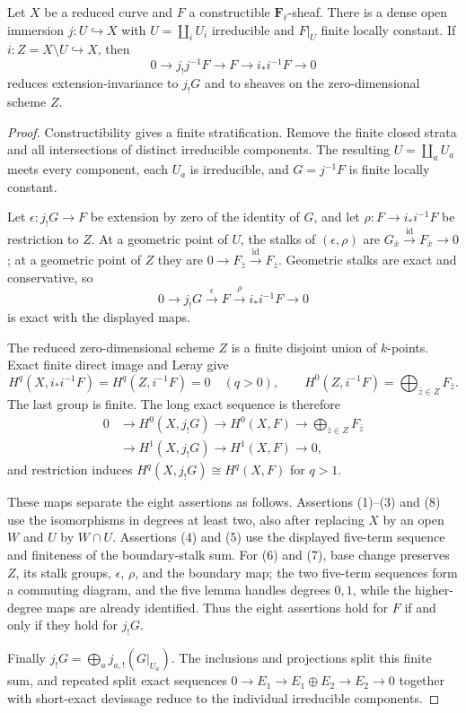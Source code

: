 \begin{lemma}
\label{lemma:weil-pbc-curve-dense-open-reduction}
\uses{}

Let $X$ be a reduced curve and $F$ a constructible $\mathbf F_\ell$-sheaf.
There is a dense open immersion $j:U\hookrightarrow X$ with
$U=\coprod_iU_i$ irreducible and $F|_U$ finite locally constant.  If
$i:Z=X\setminus U\hookrightarrow X$, then
\[
 0\longrightarrow j_!j^{-1}F\longrightarrow F
 \longrightarrow i_*i^{-1}F\longrightarrow0
\]
reduces extension-invariance to $j_!G$ and to sheaves on the zero-dimensional
scheme $Z$.
\end{lemma}
\begin{proof}

Constructibility gives a finite stratification.  Remove the finite closed
strata and all intersections of distinct irreducible components.  The
resulting $U=\coprod_aU_a$ meets every component, each $U_a$ is irreducible,
and $G=j^{-1}F$ is finite locally constant.

Let $\epsilon:j_!G\to F$ be extension by zero of the identity of $G$, and
let $\rho:F\to i_*i^{-1}F$ be restriction to $Z$.  At a geometric point of
$U$, the stalks of $(\epsilon,\rho)$ are
$G_{\bar x}\xrightarrow{\mathrm{id}}F_{\bar x}\to0$; at a geometric point
of $Z$ they are $0\to F_{\bar z}\xrightarrow{\mathrm{id}}F_{\bar z}$.
Geometric stalks are exact and conservative, so
\[
 0\longrightarrow j_!G\xrightarrow{\epsilon}F
 \xrightarrow{\rho}i_*i^{-1}F\longrightarrow0
\]
is exact with the displayed maps.

The reduced zero-dimensional scheme $Z$ is a finite disjoint union of
$k$-points.  Exact finite direct image and Leray give
\[
 H^q(X,i_*i^{-1}F)=H^q(Z,i^{-1}F)=0\quad(q>0),\qquad
 H^0(Z,i^{-1}F)=\bigoplus_{\bar z\in Z}F_{\bar z}.
\]
The last group is finite.  The long exact sequence is therefore
\[
\begin{split}
0&\to H^0(X,j_!G)\to H^0(X,F)\to
 \bigoplus_{\bar z\in Z}F_{\bar z}\\
 &\to H^1(X,j_!G)\to H^1(X,F)\to0,
\end{split}
\]
and restriction induces $H^q(X,j_!G)\cong H^q(X,F)$ for $q>1$.

These maps separate the eight assertions as follows.  Assertions (1)--(3)
and (8) use the isomorphisms in degrees at least two, also after replacing
$X$ by an open $W$ and $U$ by $W\cap U$.  Assertions (4) and (5) use the
displayed five-term sequence and finiteness of the boundary-stalk sum.
For (6) and (7), base change preserves $Z$, its stalk groups, $\epsilon$,
$\rho$, and the boundary map; the two five-term sequences form a commuting
diagram, and the five lemma handles degrees $0,1$, while the higher-degree
maps are already identified.  Thus the eight assertions hold for $F$ if
and only if they hold for $j_!G$.

Finally $j_!G=\bigoplus_a j_{a,!}(G|_{U_a})$.  The inclusions and projections
split this finite sum, and repeated split exact sequences
$0\to E_1\to E_1\oplus E_2\to E_2\to0$ together with short-exact devissage
reduce to the individual irreducible components.
\end{proof}
